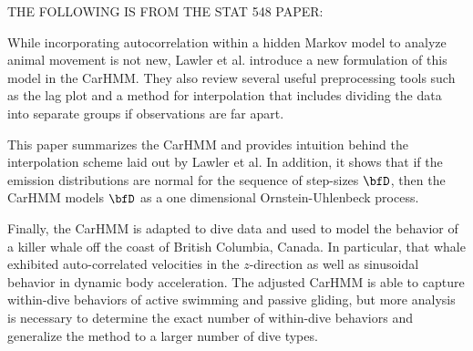 

THE FOLLOWING IS FROM THE STAT 548 PAPER:

While incorporating autocorrelation within a hidden Markov model to analyze animal movement is not new, Lawler et al. introduce a new formulation of this model in the CarHMM. They also review several useful preprocessing tools such as the lag plot and a method for interpolation that includes dividing the data into separate groups if observations are far apart. 

This paper summarizes the CarHMM and provides intuition behind the interpolation scheme laid out by Lawler et al. In addition, it shows that if the emission distributions are normal for the sequence of step-sizes $\bfD$, then the CarHMM models $\bfD$ as a one dimensional Ornstein-Uhlenbeck process.

Finally, the CarHMM is adapted to dive data and used to model the behavior of a killer whale off the coast of British Columbia, Canada. In particular, that whale exhibited auto-correlated velocities in the $z$-direction as well as sinusoidal behavior in dynamic body acceleration. The adjusted CarHMM is able to capture within-dive behaviors of active swimming and passive gliding, but more analysis is necessary to determine the exact number of within-dive behaviors and generalize the method to a larger number of dive types.